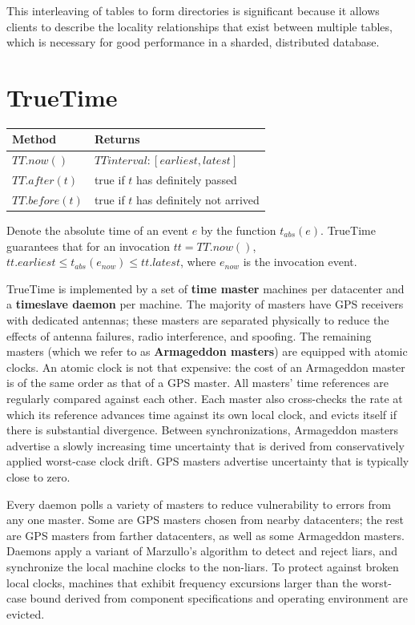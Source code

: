 \documentclass[11pt]{article}
\begin{document}
This interleaving of tables to form directories is significant because it allows clients to describe
the locality relationships that exist between multiple tables, which is necessary for good
performance in a sharded, distributed database. \label{1}
\section{TrueTime}
\label{sec:org9b5f3d9}
\begin{center}
\begin{tabular}{ll}
\hline
Method & Returns\\
\hline
\(TT.now()\) & \(TTinterval:[earliest,latest]\)\\
\(TT.after(t)\) & true if \(t\) has definitely passed\\
\(TT.before(t)\) & true if \(t\) has definitely not arrived\\
\hline
\end{tabular}
\end{center}

Denote the absolute time of an event \(e\) by the function \(t_{abs}(e)\). TrueTime guarantees that
for an invocation \(tt=TT.now()\), \(tt.earliest\le t_{abs}(e_{now})\le tt.latest\), where \(e_{now}\)
is the invocation event.

TrueTime is implemented by a set of \textbf{time master} machines per datacenter and a \textbf{timeslave daemon} per
machine. The majority of masters have GPS receivers with dedicated antennas; these masters are
separated physically to reduce the effects of antenna failures, radio interference, and spoofing. The
remaining masters (which we refer to as \textbf{Armageddon masters}) are equipped with atomic clocks. An atomic
clock is not that expensive: the cost of an Armageddon master is of the same order as that of a GPS
master. All masters’ time references are regularly compared against each other. Each master also
cross-checks the rate at which its reference advances time against its own local clock, and evicts
itself if there is substantial divergence. Between synchronizations, Armageddon masters advertise a
slowly increasing time uncertainty that is derived from conservatively applied worst-case clock drift.
GPS masters advertise uncertainty that is typically close to zero.

Every daemon polls a variety of masters to reduce vulnerability to errors from any one master. Some
are GPS masters chosen from nearby datacenters; the rest are GPS masters from farther datacenters, as
well as some Armageddon masters. Daemons apply a variant of Marzullo’s algorithm to detect and reject
liars, and synchronize the local machine clocks to the non-liars. To protect against broken local
clocks, machines that exhibit frequency excursions larger than the worst-case bound derived from
component specifications and operating environment are evicted.
\end{document}
